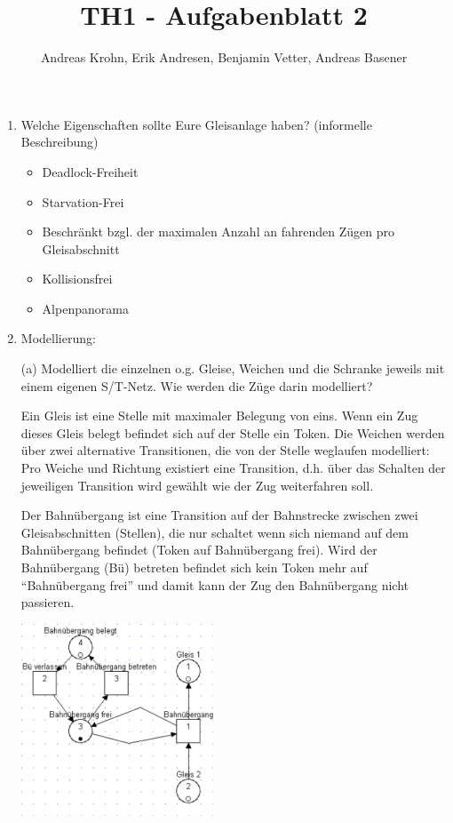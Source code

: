\documentclass{scrreprt}
\title{TH1 - Aufgabenblatt 2}
\author{Andreas Krohn, Erik Andresen, Benjamin Vetter, Andreas Basener}
\begin{document}
\maketitle

\begin{enumerate}

\item Welche Eigenschaften sollte Eure Gleisanlage haben? (informelle Beschreibung)

\begin{itemize}
  \item Deadlock-Freiheit
  \item Starvation-Frei
  \item Beschränkt bzgl. der maximalen Anzahl an fahrenden Zügen pro Gleisabschnitt
  \item Kollisionsfrei
  \item Alpenpanorama
\end{itemize}

\newpage

\item Modellierung:

(a) Modelliert die einzelnen o.g. Gleise, Weichen und die Schranke jeweils mit
    einem eigenen S/T-Netz. Wie werden die Züge darin modelliert?


Ein Gleis ist eine Stelle mit maximaler Belegung von eins. Wenn ein Zug dieses Gleis belegt befindet sich auf der Stelle ein Token.
Die Weichen werden über zwei alternative Transitionen, die von der Stelle weglaufen modelliert: Pro Weiche und Richtung existiert eine Transition, d.h. über das Schalten der
jeweiligen Transition wird gewählt wie der Zug weiterfahren soll.

Der Bahnübergang ist eine Transition auf der Bahnstrecke zwischen zwei Gleisabschnitten (Stellen), die nur schaltet wenn sich niemand auf dem Bahnübergang befindet (Token auf Bahnübergang frei). Wird der Bahnübergang (Bü) betreten befindet sich kein Token mehr auf "`Bahnübergang frei"' und damit kann der Zug den Bahnübergang nicht passieren.

\includegraphics[width=0.45\textwidth]{bahnuebergang.pdf}


\end{enumerate}
\end{document}
